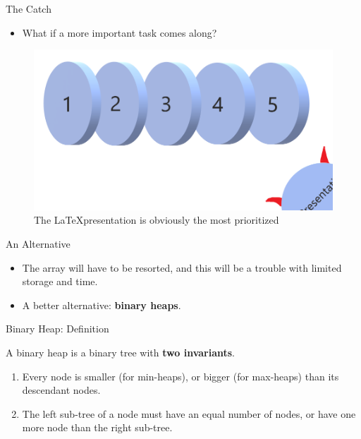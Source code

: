 \documentclass{beamer}
\begin{document}
\begin{frame}{The Catch}
    \begin{itemize}
        \item What if a more important task comes along?
    \end{itemize}
    \pause
    \begin{figure}
        \centering
        \includegraphics[scale=0.3]{4.png}
        \caption{The \LaTeX presentation is obviously the most prioritized}
        \label{fig:my_label}
    \end{figure}
\end{frame}

\begin{frame}{An Alternative}
    \begin{itemize}
        \item The array will have to be resorted, and this will be a trouble with limited storage and time.
        \item A better alternative: \textbf{binary heaps}.
    \end{itemize}
\end{frame}

\begin{frame}{Binary Heap: Definition}
    \item A binary heap is a binary tree with \textbf{two invariants}.
    \begin{enumerate}
        \item Every node is smaller (for min-heaps), or bigger (for max-heaps) than its descendant nodes.
        \item The left sub-tree of a node must have an equal number of nodes, or have one more node than the right sub-tree.
    \end{enumerate}
\end{frame}
\end{document}
